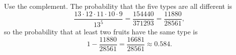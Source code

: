 Use the complement. The probability that the five types are all different is
\[\dfrac{13\cdot12\cdot11\cdot10\cdot9}{13^5}=\dfrac{154440}{371293}=\dfrac{11880}{28561},\]
so the probability that at least two fruits have the same type is
\[1-\dfrac{11880}{28561}=\boxed{\dfrac{16681}{28561}}\approx0.584.\]
